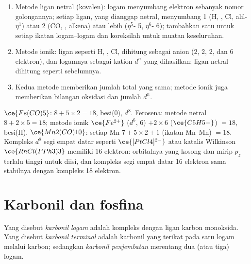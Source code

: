 \begin{method}\label{met:b3:organometallic-bonding:count}
\begin{enumerate}
  \item Metode ligan netral (kovalen): logam menyumbang elektron sebanyak nomor
        golongannya; setiap ligan, yang dianggap netral, menyumbang 1 (H, , Cl,
        alil-$\eta^1$) atau 2 (CO, , alkena) atau lebih ($\eta^5$- 5, $\eta^6$- 6); tambahkan satu untuk setiap
        ikatan logam--logam dan koreksilah untuk muatan keseluruhan.
  \item Metode ionik: ligan seperti H, , Cl,  dihitung sebagai anion (2, 2,
        2, dan 6 elektron), dan logamnya sebagai kation $d^n$ yang dihasilkan; ligan netral
        dihitung seperti sebelumnya.
  \item Kedua metode memberikan jumlah total yang sama; metode ionik juga memberikan
        bilangan oksidasi dan jumlah $d^n$.
\end{enumerate}
\end{method}

\begin{example}[Penghitungan]\label{ex:b3:organometallic-bonding:count}
$\ce{Fe(CO)5}$: $8 + 5 \times 2 = 18$, besi(0), $d^8$. Ferosena: metode netral $8 + 2 \times 5 = 18$; metode ionik
$\ce{Fe^{2+}}$ ($d^6$, 6) $+ 2 \times 6$ ($\ce{C5H5-}$) $= 18$, besi(II). $\ce{Mn2(CO)10}$: setiap Mn $7 + 5 \times 2 + 1$ (ikatan
Mn--Mn) $= 18$. Kompleks $d^8$ segi empat datar seperti $\ce{[PtCl4]^{2-}}$ atau katalis Wilkinson
$\ce{RhCl(PPh3)3}$ memiliki 16 elektron: orbitalnya yang kosong dan mirip $p_z$ terlalu tinggi untuk diisi, dan
kompleks segi empat datar 16 elektron sama stabilnya dengan kompleks 18 elektron.
\end{example}

\section{Karbonil dan fosfina}

\begin{definition}\label{def:b3:organometallic-bonding:carbonyl}
Yang disebut \emph{karbonil logam} adalah kompleks dengan ligan
karbon monoksida. Yang disebut \emph{karbonil terminal} adalah karbonil yang terikat pada satu
logam melalui karbon; sedangkan \emph{karbonil penjembatan}
merentang dua (atau tiga) logam.
\end{definition}

